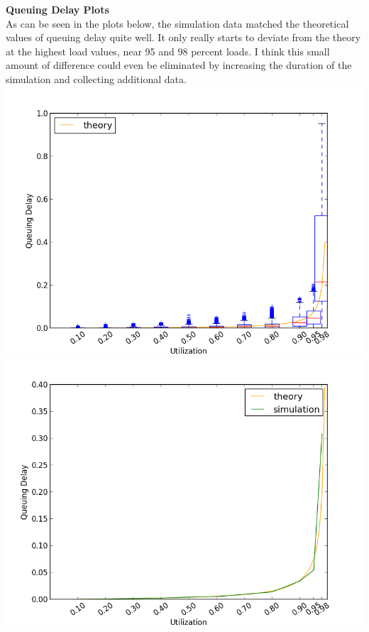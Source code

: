 \documentclass[11pt]{article}
\begin{document}
\vspace{1.0cm}
\noindent
\textbf{Queuing Delay Plots}
\\
As can be seen in the plots below, the simulation data matched the theoretical values of queuing delay quite well. It only really starts to deviate from the theory at the highest load values, near 95 and 98 percent loads. I think this small amount of difference could even be eliminated by increasing the duration of the simulation and collecting additional data.
\\
\includegraphics[width=15cm]{queuingtheory/QueuingDelayBoxplot}\\
\vspace{1.0cm}
\includegraphics[width=15cm]{queuingtheory/QueuingDelayAverages}
\end{document}
